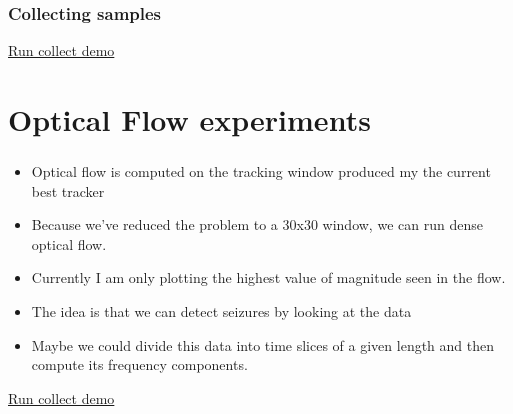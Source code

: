 \documentclass{beamer}
\begin{document}
\begin{frame}
  \frametitle{Collecting samples}
  \href{run:runCollect.sh}{Run collect demo}
\end{frame}

\section{Optical Flow experiments}
\begin{frame}
  \frametitle{\secname}
  \begin{itemize}
      \item Optical flow is computed on the tracking window produced my the current best tracker
      \item Because we've reduced the problem to a 30x30 window, we can run dense optical flow.
      \item Currently I am only plotting the highest value of magnitude seen in the flow.
      \item The idea is that we can detect seizures by looking at the data
      \item Maybe we could divide this data into time slices of a given length and then compute its frequency
        components.
    \end{itemize}
  \href{run:runCollect.sh}{Run collect demo}
\end{frame}
\end{document}
